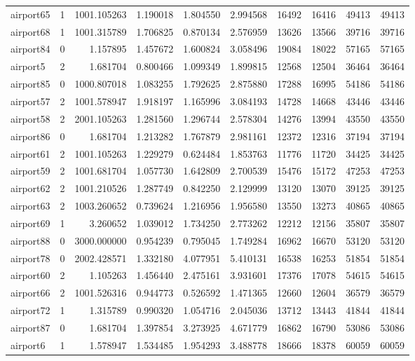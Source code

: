 \begin{longtable}{|l|r|r|r|r|r|r|r|r|r|}
airport65 & 1 & 1001.105263 & 1.190018 & 1.804550 & 2.994568 & 16492 & 16416 & 49413 & 49413 \\
airport68 & 1 & 1001.315789 & 1.706825 & 0.870134 & 2.576959 & 13626 & 13566 & 39716 & 39716 \\
airport84 & 0 & 1.157895 & 1.457672 & 1.600824 & 3.058496 & 19084 & 18022 & 57165 & 57165 \\
airport5 & 2 & 1.681704 & 0.800466 & 1.099349 & 1.899815 & 12568 & 12504 & 36464 & 36464 \\
airport85 & 0 & 1000.807018 & 1.083255 & 1.792625 & 2.875880 & 17288 & 16995 & 54186 & 54186 \\
airport57 & 2 & 1001.578947 & 1.918197 & 1.165996 & 3.084193 & 14728 & 14668 & 43446 & 43446 \\
airport58 & 2 & 2001.105263 & 1.281560 & 1.296744 & 2.578304 & 14276 & 13994 & 43550 & 43550 \\
airport86 & 0 & 1.681704 & 1.213282 & 1.767879 & 2.981161 & 12372 & 12316 & 37194 & 37194 \\
airport61 & 2 & 1001.105263 & 1.229279 & 0.624484 & 1.853763 & 11776 & 11720 & 34425 & 34425 \\
airport59 & 2 & 1001.681704 & 1.057730 & 1.642809 & 2.700539 & 15476 & 15172 & 47253 & 47253 \\
airport62 & 2 & 1001.210526 & 1.287749 & 0.842250 & 2.129999 & 13120 & 13070 & 39125 & 39125 \\
airport63 & 2 & 1003.260652 & 0.739624 & 1.216956 & 1.956580 & 13550 & 13273 & 40865 & 40865 \\
airport69 & 1 & 3.260652 & 1.039012 & 1.734250 & 2.773262 & 12212 & 12156 & 35807 & 35807 \\
airport88 & 0 & 3000.000000 & 0.954239 & 0.795045 & 1.749284 & 16962 & 16670 & 53120 & 53120 \\
airport78 & 0 & 2002.428571 & 1.332180 & 4.077951 & 5.410131 & 16538 & 16253 & 51854 & 51854 \\
airport60 & 2 & 1.105263 & 1.456440 & 2.475161 & 3.931601 & 17376 & 17078 & 54615 & 54615 \\
airport66 & 2 & 1001.526316 & 0.944773 & 0.526592 & 1.471365 & 12660 & 12604 & 36579 & 36579 \\
airport72 & 1 & 1.315789 & 0.990320 & 1.054716 & 2.045036 & 13712 & 13443 & 41844 & 41844 \\
airport87 & 0 & 1.681704 & 1.397854 & 3.273925 & 4.671779 & 16862 & 16790 & 53086 & 53086 \\
airport6 & 1 & 1.578947 & 1.534485 & 1.954293 & 3.488778 & 18666 & 18378 & 60059 & 60059 \\

\end{longtable}

